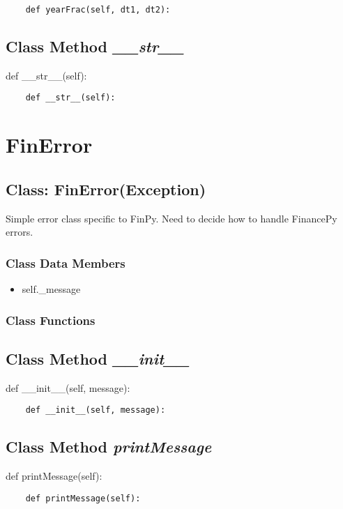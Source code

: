 \documentclass[twoside,11pt]{book}
\begin{document}
\begin{lstlisting}
    def yearFrac(self, dt1, dt2):
\end{lstlisting}

\subsection{Class Method {\it \_\_str\_\_}}
def \_\_str\_\_(self):

\begin{lstlisting}
    def __str__(self):
\end{lstlisting}

\newpage
\section{FinError}

\subsection{Class: FinError(Exception)}
Simple error class specific to FinPy. Need to decide how to handle FinancePy errors. 

\subsubsection{Class Data Members}
\begin{itemize}
\item{self.\_message}
\end{itemize}

\subsubsection{Class Functions}

\subsection{Class Method {\it \_\_init\_\_}}
def \_\_init\_\_(self, message):

\begin{lstlisting}
    def __init__(self, message):
\end{lstlisting}

\subsection{Class Method {\it printMessage}}
def printMessage(self):

\begin{lstlisting}
    def printMessage(self):
\end{lstlisting}
\end{document}
